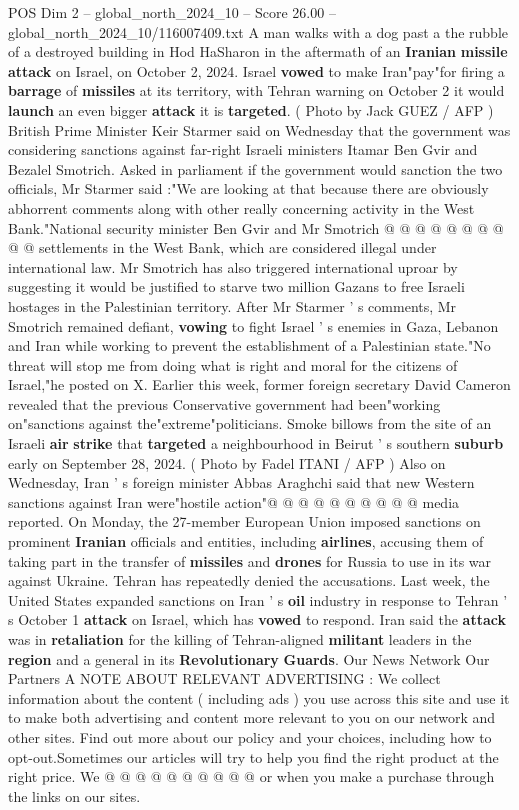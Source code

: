 \begin{textsample}{POS Dim 2 – global\_north\_2024\_10 – Score 26.00 – global\_north\_2024\_10/116007409.txt}
A man walks with a dog past a the rubble of a destroyed building in Hod HaSharon in the aftermath of an \textbf{Iranian} \textbf{missile} \textbf{attack} on Israel, on October 2, 2024.
Israel \textbf{vowed} to make Iran"pay"for firing a \textbf{barrage} of \textbf{missiles} at its territory, with Tehran warning on October 2 it would \textbf{launch} an even bigger \textbf{attack} it is \textbf{targeted}. ( Photo by Jack GUEZ / AFP ) British Prime Minister Keir Starmer said on Wednesday that the government was considering sanctions against far-right Israeli ministers Itamar Ben Gvir and Bezalel Smotrich.
Asked in parliament if the government would sanction the two officials, Mr Starmer said :"We are looking at that because there are obviously abhorrent comments along with other really concerning activity in the West Bank."National security minister Ben Gvir and Mr Smotrich @ @ @ @ @ @ @ @ @ @ settlements in the West Bank, which are considered illegal under international law.
Mr Smotrich has also triggered international uproar by suggesting it would be justified to starve two million Gazans to free Israeli hostages in the Palestinian territory.
After Mr Starmer ' s comments, Mr Smotrich remained defiant, \textbf{vowing} to fight Israel ' s enemies in Gaza, Lebanon and Iran while working to prevent the establishment of a Palestinian state."No threat will stop me from doing what is right and moral for the citizens of Israel,"he posted on X.
Earlier this week, former foreign secretary David Cameron revealed that the previous Conservative government had been"working on"sanctions against the"extreme"politicians.
Smoke billows from the site of an Israeli \textbf{air} \textbf{strike} that \textbf{targeted} a neighbourhood in Beirut ' s southern \textbf{suburb} early on September 28, 2024. ( Photo by Fadel ITANI / AFP ) Also on Wednesday, Iran ' s foreign minister Abbas Araghchi said that new Western sanctions against Iran were"hostile action"@ @ @ @ @ @ @ @ @ @ media reported.
On Monday, the 27-member European Union imposed sanctions on prominent \textbf{Iranian} officials and entities, including \textbf{airlines}, accusing them of taking part in the transfer of \textbf{missiles} and \textbf{drones} for Russia to use in its war against Ukraine.
Tehran has repeatedly denied the accusations.
Last week, the United States expanded sanctions on Iran ' s \textbf{oil} industry in response to Tehran ' s October 1 \textbf{attack} on Israel, which has \textbf{vowed} to respond.
Iran said the \textbf{attack} was in \textbf{retaliation} for the killing of Tehran-aligned \textbf{militant} leaders in the \textbf{region} and a general in its \textbf{Revolutionary} \textbf{Guards}.
Our News Network Our Partners A NOTE ABOUT RELEVANT ADVERTISING : We collect information about the content ( including ads ) you use across this site and use it to make both advertising and content more relevant to you on our network and other sites.
Find out more about our policy and your choices, including how to opt-out.Sometimes our articles will try to help you find the right product at the right price.
We @ @ @ @ @ @ @ @ @ @ or when you make a purchase through the links on our sites.


\end{textsample}
